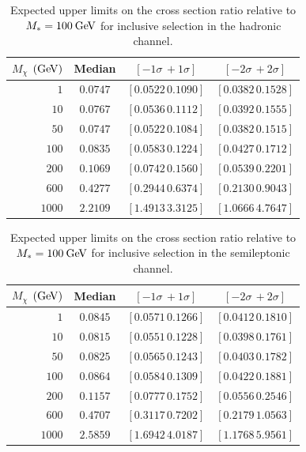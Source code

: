 \begin{table}[!ht]
\centering
\begin{tabular}{|r|c|c|c|}
\hline
  $M_\chi$ $(\mathrm{Ge\kern -0.1em V})$ & Median & $\left[-1\sigma\, +1\sigma\right]$ & $\left[-2\sigma\, +2\sigma\right]$ \\
\hline
  $1$               & $0.0747$ & $\left[0.0522\, 0.1090\right]$ & $\left[0.0382\, 0.1528\right]$ \\
  $10$              & $0.0767$ & $\left[0.0536\, 0.1112\right]$ & $\left[0.0392\, 0.1555\right]$ \\
  $50$              & $0.0747$ & $\left[0.0522\, 0.1084\right]$ & $\left[0.0382\, 0.1515\right]$ \\
  $100$             & $0.0835$ & $\left[0.0583\, 0.1224\right]$ & $\left[0.0427\, 0.1712\right]$ \\
  $200$             & $0.1069$ & $\left[0.0742\, 0.1560\right]$ & $\left[0.0539\, 0.2201\right]$ \\
  $600$             & $0.4277$ & $\left[0.2944\, 0.6374\right]$ & $\left[0.2130\, 0.9043\right]$ \\
  $1000$            & $2.2109$ & $\left[1.4913\, 3.3125\right]$ & $\left[1.0666\, 4.7647\right]$ \\
\hline
\end{tabular}
\caption{Expected upper limits on the cross section ratio relative to $M_*=100\:\mathrm{Ge\kern -0.1em V}$ for inclusive selection in the hadronic channel.}
\label{tab:rLimits_hadronic_shape}
\end{table}

\begin{table}[!ht]
\centering
\begin{tabular}{|r|c|c|c|}
\hline
  $M_\chi$ $(\mathrm{Ge\kern -0.1em V})$ & Median & $\left[-1\sigma\, +1\sigma\right]$ & $\left[-2\sigma\, +2\sigma\right]$ \\
\hline
  $1$               & $0.0845$ & $\left[0.0571\, 0.1266\right]$ & $\left[0.0412\, 0.1810\right]$ \\
  $10$              & $0.0815$ & $\left[0.0551\, 0.1228\right]$ & $\left[0.0398\, 0.1761\right]$ \\
  $50$              & $0.0825$ & $\left[0.0565\, 0.1243\right]$ & $\left[0.0403\, 0.1782\right]$ \\
  $100$             & $0.0864$ & $\left[0.0584\, 0.1309\right]$ & $\left[0.0422\, 0.1881\right]$ \\
  $200$             & $0.1157$ & $\left[0.0777\, 0.1752\right]$ & $\left[0.0556\, 0.2546\right]$ \\
  $600$             & $0.4707$ & $\left[0.3117\, 0.7202\right]$ & $\left[0.2179\, 1.0563\right]$ \\
  $1000$            & $2.5859$ & $\left[1.6942\, 4.0187\right]$ & $\left[1.1768\, 5.9561\right]$ \\
\hline
\end{tabular}
\caption{Expected upper limits on the cross section ratio relative to $M_*=100\:\mathrm{Ge\kern -0.1em V}$ for inclusive selection in the semileptonic channel.}
\label{tab:rLimits_semilept_shape}
\end{table}

